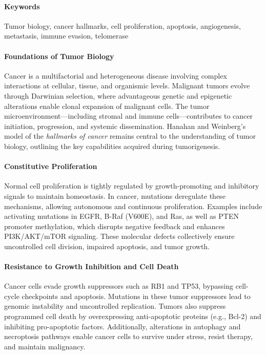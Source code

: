 \documentclass[10pt]{extarticle}
\begin{document}
\paragraph{Keywords} Tumor biology, cancer hallmarks, cell proliferation, apoptosis, angiogenesis, metastasis, immune evasion, telomerase \cite{azizi2022introduction}

\paragraph{Foundations of Tumor Biology}
Cancer is a multifactorial and heterogeneous disease involving complex interactions at cellular, tissue, and organismic levels. Malignant tumors evolve through Darwinian selection, where advantageous genetic and epigenetic alterations enable clonal expansion of malignant cells. The tumor microenvironment—including stromal and immune cells—contributes to cancer initiation, progression, and systemic dissemination. Hanahan and Weinberg’s model of the \textit{hallmarks of cancer} remains central to the understanding of tumor biology, outlining the key capabilities acquired during tumorigenesis.

\paragraph{Constitutive Proliferation}
Normal cell proliferation is tightly regulated by growth-promoting and inhibitory signals to maintain homeostasis. In cancer, mutations deregulate these mechanisms, allowing autonomous and continuous proliferation. Examples include activating mutations in EGFR, B-Raf (V600E), and Ras, as well as PTEN promoter methylation, which disrupts negative feedback and enhances PI3K/AKT/mTOR signaling. These molecular defects collectively ensure uncontrolled cell division, impaired apoptosis, and tumor growth.

\paragraph{Resistance to Growth Inhibition and Cell Death}
Cancer cells evade growth suppressors such as RB1 and TP53, bypassing cell-cycle checkpoints and apoptosis. Mutations in these tumor suppressors lead to genomic instability and uncontrolled replication. Tumors also suppress programmed cell death by overexpressing anti-apoptotic proteins (e.g., Bcl-2) and inhibiting pro-apoptotic factors. Additionally, alterations in autophagy and necroptosis pathways enable cancer cells to survive under stress, resist therapy, and maintain malignancy.
\end{document}
